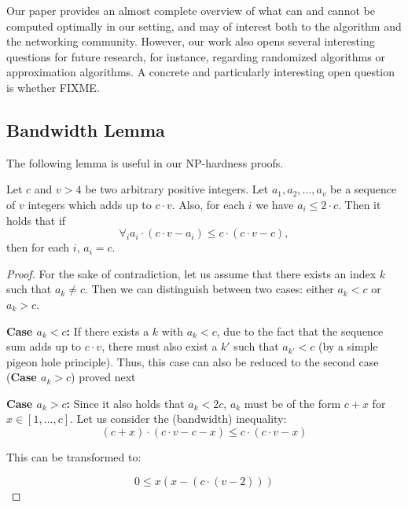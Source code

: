 \documentclass[9pt,twocolumn]{scrartcl}
\begin{document}
Our paper provides an almost complete overview of what can and cannot be
computed optimally in our setting, and may of interest both to the algorithm
and the networking community. However, our work also opens several interesting
questions for future research, for instance, regarding randomized algorithms
or approximation algorithms. A concrete and particularly interesting open
question is whether FIXME.






\begin{appendix}


\section{Bandwidth Lemma}

The following lemma is useful in our NP-hardness proofs.

\begin{lemma}\label{lem:bandwidth-lemma}
  Let $c$ and $v > 4$ be two arbitrary positive integers. Let $a_1, a_2, \ldots,
  a_v$ be a sequence of $v$ integers which adds up to $c \cdot v$. Also, for
  each $i$ we have $a_i \leq 2 \cdot c$. Then it holds that if 
  $$ \forall_i a_i \cdot (c \cdot v - a_i) \leq c \cdot (c \cdot v -
  c), $$
\noindent  then for each $i$, $a_i = c$.
\end{lemma}
\begin{proof}
For the sake of contradiction, let us assume that there exists an index $k$ such that
$a_k \neq c$. Then we can distinguish between two cases: 
either $a_k<c$ or
$a_k>c$. 

\textbf{Case $a_k<c$:} If there exists a $k$ with $a_k<c$,
due to the fact that the sequence sum adds up to $c \cdot v$,
there must also exist a $k'$ such that $a_{k'}<c$ (by a simple
pigeon hole principle). Thus, this case can
also be reduced to the second case (\textbf{Case $a_k>c$}) proved
next

\textbf{Case $a_k>c$:} Since it also holds that $a_k < 2c$, 
$a_k$ must be of the form $c + x$ for $x \in [1, \ldots, c]$. 
Let us consider the (bandwidth) inequality:
$$ (c + x) \cdot (c \cdot v - c - x) \leq c \cdot (c \cdot v - x) $$

This can be transformed to:

$$ 0 \leq x(x - (c \cdot (v - 2))) $$


\end{proof}
\end{appendix}
\end{document}
